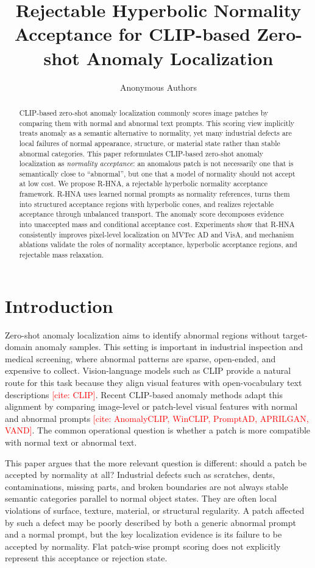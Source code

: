 \documentclass[10pt]{article}
\title{Rejectable Hyperbolic Normality Acceptance for CLIP-based Zero-shot Anomaly Localization}
\author{Anonymous Authors}
\date{}
\newcommand{\method}{R-HNA}
\newcommand{\needcite}[1]{\textcolor{red}{[cite: #1]}}
\begin{document}
\maketitle

\begin{abstract}
CLIP-based zero-shot anomaly localization commonly scores image patches by comparing them with normal and abnormal text prompts.
This scoring view implicitly treats anomaly as a semantic alternative to normality, yet many industrial defects are local failures of normal appearance, structure, or material state rather than stable abnormal categories.
This paper reformulates CLIP-based zero-shot anomaly localization as \emph{normality acceptance}: an anomalous patch is not necessarily one that is semantically close to ``abnormal'', but one that a model of normality should not accept at low cost.
We propose \method{}, a rejectable hyperbolic normality acceptance framework.
\method{} uses learned normal prompts as normality references, turns them into structured acceptance regions with hyperbolic cones, and realizes rejectable acceptance through unbalanced transport.
The anomaly score decomposes evidence into unaccepted mass and conditional acceptance cost.
Experiments show that \method{} consistently improves pixel-level localization on MVTec AD and VisA, and mechanism ablations validate the roles of normality acceptance, hyperbolic acceptance regions, and rejectable mass relaxation.
\end{abstract}

\section{Introduction}

Zero-shot anomaly localization aims to identify abnormal regions without target-domain anomaly samples.
This setting is important in industrial inspection and medical screening, where abnormal patterns are sparse, open-ended, and expensive to collect.
Vision-language models such as CLIP provide a natural route for this task because they align visual features with open-vocabulary text descriptions \needcite{CLIP}.
Recent CLIP-based anomaly methods adapt this alignment by comparing image-level or patch-level visual features with normal and abnormal prompts \needcite{AnomalyCLIP, WinCLIP, PromptAD, APRILGAN, VAND}.
The common operational question is whether a patch is more compatible with normal text or abnormal text.

This paper argues that the more relevant question is different: should a patch be accepted by normality at all?
Industrial defects such as scratches, dents, contaminations, missing parts, and broken boundaries are not always stable semantic categories parallel to normal object states.
They are often local violations of surface, texture, material, or structural regularity.
A patch affected by such a defect may be poorly described by both a generic abnormal prompt and a normal prompt, but the key localization evidence is its failure to be accepted by normality.
Flat patch-wise prompt scoring does not explicitly represent this acceptance or rejection state.
\end{document}
